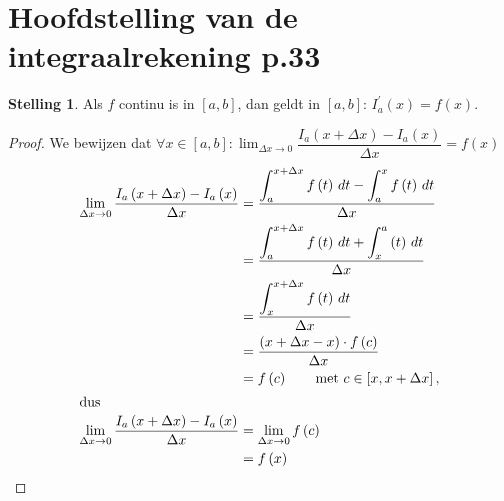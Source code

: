 \documentclass{article}
\theoremstyle{definition}
\newtheorem*{Stelling}{Stelling}
\begin{document}
\section{Hoofdstelling van de integraalrekening p.33}
\begin{Stelling}
  Als $f$ continu is in $\left[a,b\right]$, dan geldt in $\left[a,b\right]$: $I_a^{'} \left(x\right) = f\left(x\right)$.
\end{Stelling}
\begin{proof}
  We bewijzen dat $\forall x \in \left[a,b\right]: \displaystyle\lim_{\Delta x \to 0} \dfrac{I_a\left(x+\Delta x\right) - I_a\left(x\right)}{\Delta x} = f\left(x\right)$
\begin{align*}
  \lim_{\Delta x \to 0} \dfrac{I_a\left(x+\Delta x\right) - I_a\left(x\right)}{\Delta x} &= \frac{\displaystyle\int_{a}^{x+\Delta x}f\left(t\right)\, dt - \displaystyle\int_{a}^{x}f\left(t\right)\, dt}{\Delta x}\\
                                                                                         &= \frac{\displaystyle\int_{a}^{x+\Delta x}f\left(t\right)\, dt + \displaystyle\int_{x}^{a}\left(t\right)\, dt}{\Delta x}\\
                                                                                         &= \frac{\displaystyle\int_{x}^{x+\Delta x}f\left(t\right)\, dt}{\Delta x}\\
                                                                                         &=\frac{\left(x+\Delta x -x\right)\cdot f\left(c\right)}{\Delta x}\\
                                                                                         &=f\left(c\right) \qquad \text{met } c\in \left[x, x+\Delta x\right],\\
                                                                                         \intertext{dus}
  \displaystyle\lim_{\Delta x \to 0} \dfrac{I_a\left(x+\Delta x\right) - I_a\left(x\right)}{\Delta x} &= \lim_{\Delta x \to 0} f\left(c\right)\\
                                                                                                      &=f\left(x\right)
\end{align*}
\end{proof}
\end{document}
